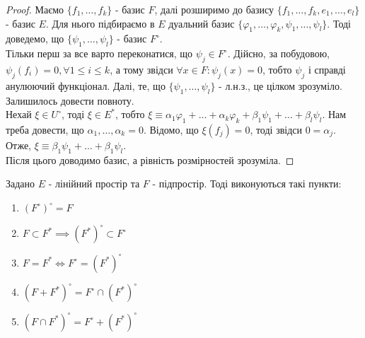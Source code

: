 \documentclass{math_library}
\begin{document}
\begin{proof}
Маємо $\{f_1,\dots,f_k\}$ - базис $F$, далі розширимо до базису $\{f_1,\dots,f_k,e_1,\dots,e_l\}$ - базис $E$. Для нього підбираємо в $E$ дуальний базис $\{\varphi_1,\dots,\varphi_k,\psi_1,\dots,\psi_l\}$. Тоді доведемо, що $\{\psi_1,\dots,\psi_l\}$ - базис $F^\circ$.
\bigskip \\
Тільки перш за все варто переконатися, що $\psi_j \in F^\circ$. Дійсно, за побудовою, $\psi_j(f_i) = 0, \forall 1 \leq i \leq k$, а тому звідси $\forall x \in F: \psi_j(x) = 0$, тобто $\psi_j$ і справді анулюючий функціонал. Далі, те, що $\{\psi_1,\dots,\psi_l\}$ - л.н.з., це цілком зрозуміло. Залишилось довести повноту.\\
Нехай $\xi \in U^\circ$, тоді $\xi \in E^*$, тобто $\xi \equiv \alpha_1 \varphi_1 + \dots + \alpha_k \varphi_k + \beta_1 \psi_1 + \dots + \beta_l \psi_l$. Нам треба довести, що $\alpha_1,\dots,\alpha_k = 0$. Відомо, що $\xi(f_j) = 0$, тоді звідси $0 = \alpha_j$. Отже, $\xi \equiv \beta_1 \psi_1 + \dots + \beta_1  \psi_l$.\\
Після цього доводимо базис, а рівність розмірностей зрозуміла.
\end{proof}

\begin{proposition}
Задано $E$ - лінійний простір та $F$ - підпростір. Тоді виконуються такі пункти:
\begin{enumerate}[nosep, wide=0pt, label={\arabic*)}]
\item $(F^{\circ})^{\circ} = F$
\item $F \subset F^* \implies (F^*)^\circ \subset F^\circ$
\item $F = F^* \iff F^\circ = (F^*)^\circ$
\item $(F+F^*)^\circ = F^\circ \cap (F^*)^\circ$
\item $(F \cap F^*)^\circ = F^\circ + (F^*)^\circ$
\end{enumerate}
\end{proposition}
\end{document}
